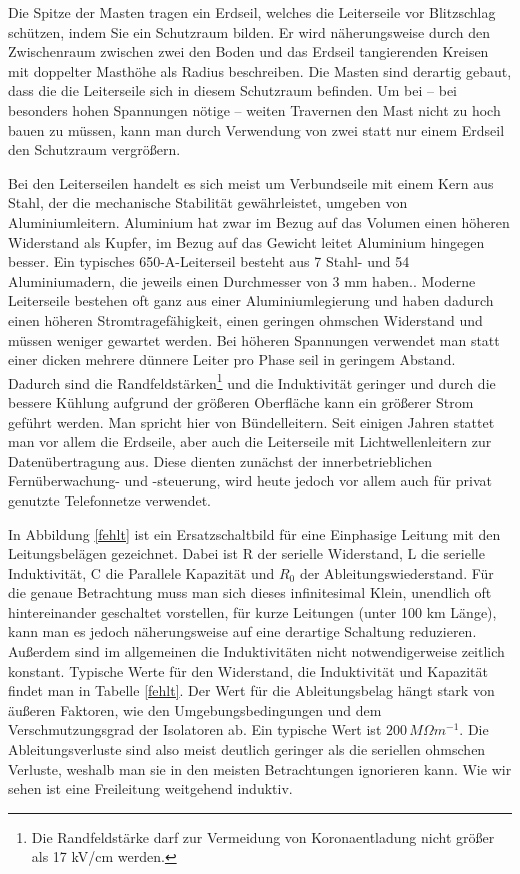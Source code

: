 \documentclass[10pt,a4paper]{article}
\begin{document}
Die Spitze der Masten tragen ein Erdseil, welches die Leiterseile vor Blitzschlag schützen, indem Sie ein Schutzraum bilden. Er wird näherungsweise durch den Zwischenraum zwischen zwei den Boden und das Erdseil tangierenden Kreisen mit doppelter Masthöhe als Radius beschreiben. Die Masten sind derartig gebaut, dass die die Leiterseile sich in diesem Schutzraum befinden. Um bei – bei besonders hohen Spannungen nötige – weiten Travernen den Mast nicht zu hoch bauen zu müssen, kann man durch Verwendung von zwei statt nur einem Erdseil den Schutzraum vergrößern.

Bei den Leiterseilen handelt es sich meist um Verbundseile mit einem Kern aus Stahl, der die mechanische Stabilität gewährleistet, umgeben von Aluminiumleitern. Aluminium hat zwar im Bezug auf das Volumen einen höheren Widerstand als Kupfer, im Bezug auf das Gewicht leitet Aluminium hingegen besser. Ein typisches 650-A-Leiterseil besteht aus 7 Stahl- und 54 Aluminiumadern, die jeweils einen Durchmesser von 3 mm haben.\cite{Harrison}.
Moderne Leiterseile bestehen oft ganz aus einer Aluminiumlegierung und haben dadurch einen höheren Stromtragefähigkeit, einen geringen ohmschen Widerstand und müssen weniger gewartet werden\cite{Harrison}.
Bei höheren Spannungen verwendet man statt einer dicken mehrere dünnere Leiter pro Phase seil in geringem Abstand. Dadurch sind die Randfeldstärken\footnote{Die Randfeldstärke darf zur Vermeidung von Koronaentladung nicht größer als 17 kV/cm werden.\cite{Flosdorff}} und die Induktivität geringer und durch die bessere Kühlung aufgrund der größeren Oberfläche kann ein größerer Strom geführt werden. Man spricht hier von Bündelleitern.
Seit einigen Jahren stattet man vor allem die Erdseile, aber auch die Leiterseile mit Lichtwellenleitern zur Datenübertragung aus. Diese dienten zunächst der innerbetrieblichen Fernüberwachung- und -steuerung, wird heute jedoch vor allem auch für privat genutzte Telefonnetze verwendet.\cite{Flosdorff}

In Abbildung \ref{fehlt} ist ein Ersatzschaltbild für eine Einphasige Leitung mit den Leitungsbelägen gezeichnet. Dabei ist R der serielle Widerstand, L die serielle Induktivität, C die Parallele Kapazität und $R_0$ der Ableitungswiederstand. Für die genaue Betrachtung muss man sich dieses infinitesimal Klein, unendlich oft hintereinander geschaltet vorstellen, für kurze Leitungen (unter 100 km Länge), kann man es jedoch näherungsweise auf eine derartige Schaltung reduzieren. Außerdem sind im allgemeinen die Induktivitäten nicht notwendigerweise zeitlich konstant.\cite{Flosdorff}
Typische Werte für den Widerstand, die Induktivität und Kapazität findet man in Tabelle \ref{fehlt}. Der Wert für die Ableitungsbelag hängt stark von äußeren Faktoren, wie den Umgebungsbedingungen und dem Verschmutzungsgrad der Isolatoren ab. Ein typische Wert ist $200\,M\Omega m^{-1}$.\cite{Harrison} Die Ableitungsverluste sind also meist deutlich geringer als die seriellen ohmschen Verluste, weshalb man sie in den meisten Betrachtungen ignorieren kann. Wie wir sehen ist eine Freileitung weitgehend induktiv.
\end{document}
